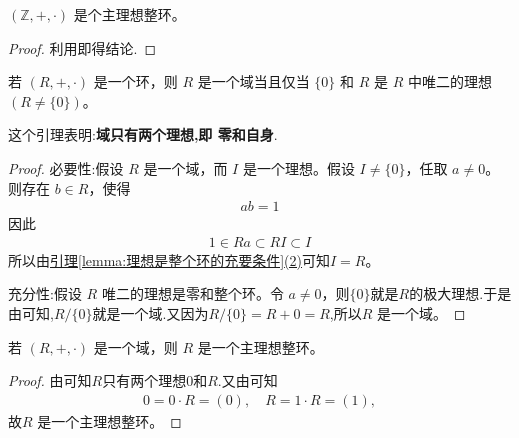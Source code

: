 \documentclass[../../main.tex]{subfiles}
\begin{document}
\begin{proposition}[整数环是主理想整环]\label{proposition:整数环是主理想整环}
$(\mathbb{Z}, +, \cdot)$ 是个主理想整环。
\end{proposition}
\begin{proof}
利用即得结论.
\end{proof}

\begin{lemma}\label{lemma:域只有两个理想:零和自身}
若 $(R, +, \cdot)$ 是一个环，则 $R$ 是一个域当且仅当 $\{0\}$ 和 $R$ 是 $R$ 中唯二的理想 $(R \neq \{0\})$。
\end{lemma}
\begin{note}
这个引理表明:\textbf{域只有两个理想,即 零和自身}.
\end{note}
\begin{proof}
{\heiti 必要性:}假设 $R$ 是一个域，而 $I$ 是一个理想。假设 $I \neq \{0\}$，任取 $a \neq 0$。则存在 $b \in R$，使得
\begin{align*}
ab = 1
\end{align*}
因此
\begin{align*}
1 \in Ra \subset RI \subset I
\end{align*}
所以由\hyperref[lemma:理想是整个环的充要条件]{引理\ref{lemma:理想是整个环的充要条件}(2)}可知$I = R$。

{\heiti 充分性:}假设 $R$ 唯二的理想是零和整个环。令 $a \neq 0$，则$\{0\}$就是$R$的极大理想.于是由可知,$R/\{0\}$就是一个域.又因为$R/\{0\}=R+0=R$,所以$R$ 是一个域。
\end{proof}

\begin{proposition}[域是主理想整环]\label{proposition:域是主理想整环}
若 $(R, +, \cdot)$ 是一个域，则 $R$ 是一个主理想整环。
\end{proposition}
\begin{proof}
由可知$R$只有两个理想$0$和$R$.又由可知
\begin{align*}
{0}=0\cdot R=(0),\quad R=1\cdot R=(1),
\end{align*}
故$R$ 是一个主理想整环。
\end{proof}
\end{document}
